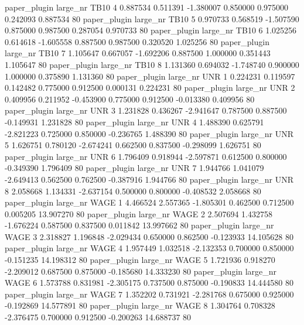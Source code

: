        paper_plugin   large_nr     TB10                 4  0.887534  0.511391  -1.380007 0.850000 0.975000  0.242093    0.887534 80
       paper_plugin   large_nr     TB10                 5  0.970733  0.568519  -1.507590 0.875000 0.987500  0.287054    0.970733 80
       paper_plugin   large_nr     TB10                 6  1.025256  0.614618  -1.605558 0.887500 0.987500  0.320520    1.025256 80
       paper_plugin   large_nr     TB10                 7  1.105647  0.667057  -1.692206 0.887500 1.000000  0.351443    1.105647 80
       paper_plugin   large_nr     TB10                 8  1.131360  0.694032  -1.748740 0.900000 1.000000  0.375890    1.131360 80
       paper_plugin   large_nr      UNR                 1  0.224231  0.119597   0.142482 0.775000 0.912500  0.000131    0.224231 80
       paper_plugin   large_nr      UNR                 2  0.409956  0.211952  -0.453900 0.775000 0.912500 -0.013380    0.409956 80
       paper_plugin   large_nr      UNR                 3  1.231828  0.436267  -2.941647 0.787500 0.887500 -0.149931    1.231828 80
       paper_plugin   large_nr      UNR                 4  1.488390  0.625791  -2.821223 0.725000 0.850000 -0.236765    1.488390 80
       paper_plugin   large_nr      UNR                 5  1.626751  0.780120  -2.674241 0.662500 0.837500 -0.298099    1.626751 80
       paper_plugin   large_nr      UNR                 6  1.796409  0.918944  -2.597871 0.612500 0.800000 -0.349390    1.796409 80
       paper_plugin   large_nr      UNR                 7  1.944766  1.041079  -2.649413 0.562500 0.762500 -0.387916    1.944766 80
       paper_plugin   large_nr      UNR                 8  2.058668  1.134331  -2.637154 0.500000 0.800000 -0.408532    2.058668 80
       paper_plugin   large_nr     WAGE                 1  4.466524  2.557365  -1.805301 0.462500 0.712500  0.005205   13.907270 80
       paper_plugin   large_nr     WAGE                 2  2.507694  1.432758  -1.676224 0.587500 0.837500  0.011842   13.997662 80
       paper_plugin   large_nr     WAGE                 3  2.318827  1.196848  -2.029434 0.650000 0.862500 -0.123933   14.105628 80
       paper_plugin   large_nr     WAGE                 4  1.957449  1.032518  -2.132353 0.700000 0.850000 -0.151235   14.198312 80
       paper_plugin   large_nr     WAGE                 5  1.721936  0.918270  -2.209012 0.687500 0.875000 -0.185680   14.333230 80
       paper_plugin   large_nr     WAGE                 6  1.573788  0.831981  -2.305175 0.737500 0.875000 -0.190833   14.444580 80
       paper_plugin   large_nr     WAGE                 7  1.352202  0.731921  -2.281768 0.675000 0.925000 -0.192869   14.577891 80
       paper_plugin   large_nr     WAGE                 8  1.304764  0.708328  -2.376475 0.700000 0.912500 -0.200263   14.688737 80